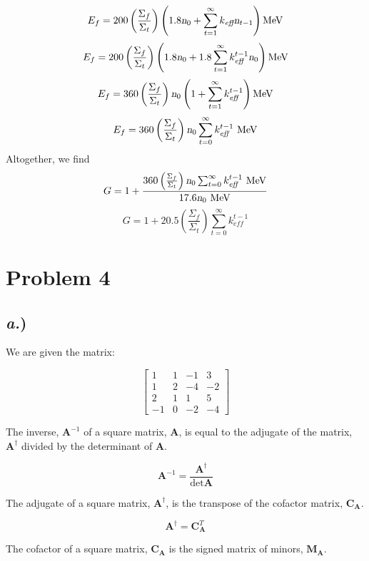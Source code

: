 \documentclass{article}
\newcommand{\Xs}{\Sigma}
\begin{document}
$$ E_f = 200 \left(\frac{\Xs_f}{\Xs_t}\right)\left(1.8\textsl{n}_0 + \sum_{t=1}^{\infty}k_{\textit{eff}}\textsl{n}_{t-1} \right) \text{MeV} $$
$$ E_f = 200 \left(\frac{\Xs_f}{\Xs_t}\right)\left(1.8\textsl{n}_0 + 1.8\sum_{t=1}^{\infty}k_{\textit{eff}}^{t-1}\textsl{n}_0 \right) \text{MeV} $$
$$ E_f = 360 \left(\frac{\Xs_f}{\Xs_t}\right)\textsl{n}_0 \left(1  + \sum_{t=1}^{\infty}k_{\textit{eff}}^{t-1} \right) \text{MeV} $$
$$ E_f = 360 \left(\frac{\Xs_f}{\Xs_t}\right)\textsl{n}_0 \sum_{t=0}^{\infty}k_{\textit{eff}}^{t-1} \text{ MeV} $$
Altogether, we find
$$ G = 1 + \frac{360 \left(\frac{\Xs_f}{\Xs_t}\right)\textsl{n}_0 \sum_{t=0}^{\infty}k_{\textit{eff}}^{t-1} \text{ MeV}}{17.6 \textsl{n}_0 \text{ MeV}} $$
$$\boxed{ G = 1 + 20.5 \left(\frac{\Xs_f}{\Xs_t}\right) \sum_{t=0}^{\infty}k_{\textit{eff}}^{t-1} }$$






\section*{Problem 4}

\subsection*{\textit{a.})}

We are given the matrix:

$$\begin{bmatrix}
1 	&	1	&	-1	&	3	\\
1	&	2	&	-4	&	-2	\\
2	&	1	&	1	&	5	\\
-1	&	0	&	-2	&	-4	\end{bmatrix}$$

The inverse, $\textbf{A}^{-1}$ of a square matrix, $\textbf{A}$,  is equal to the adjugate of the matrix, $\textbf{A}^{\dagger}$ divided by the determinant of $\textbf{A}$. 

$$ \textbf{A}^{-1} = \frac{\textbf{A}^{\dagger}}{\det{\textbf{A}}} $$

The adjugate of a square matrix, $\textbf{A}^{\dagger}$, is the transpose of the cofactor matrix, $\textbf{C}_{\textbf{A}}$.

$$ \textbf{A}^{\dagger} = \textbf{C}_{\textbf{A}}^T $$

The cofactor of a square matrix, $\textbf{C}_{\textbf{A}}$ is the signed matrix of minors, $\textbf{M}_{\textbf{A}}$.
\end{document}
